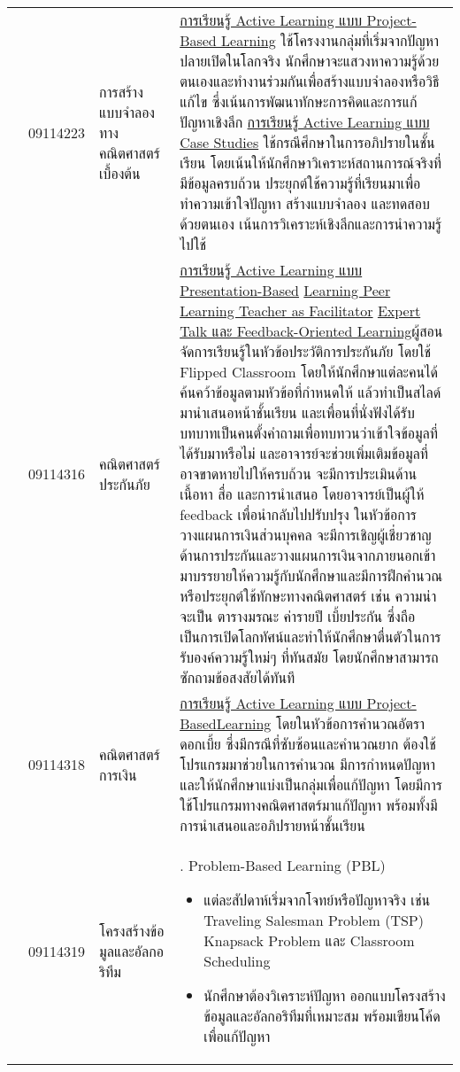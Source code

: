 {\begin{center}
\begin{longtable}{|p{}|p{}|p{}|>{\raggedcolumns}p{}|}
	\\ 
	\cline{2-4}
	& 09114223 & การสร้างแบบจำลองทางคณิตศาสตร์เบื้องต้น&
	\underline{การเรียนรู้ Active Learning แบบ Project-Based Learning} ใช้โครงงานกลุ่มที่เริ่มจากปัญหาปลายเปิดในโลกจริง นักศึกษาจะแสวงหาความรู้ด้วยตนเองและทำงานร่วมกันเพื่อสร้างแบบจำลองหรือวิธีแก้ไข ซึ่งเน้นการพัฒนาทักษะการคิดและการแก้ปัญหาเชิงลึก\newline
	\underline{การเรียนรู้ Active Learning แบบ Case Studies} ใช้กรณีศึกษาในการอภิปรายในชั้นเรียน โดยเน้นให้นักศึกษาวิเคราะห์สถานการณ์จริงที่มีข้อมูลครบถ้วน ประยุกต์ใช้ความรู้ที่เรียนมาเพื่อทำความเข้าใจปัญหา สร้างแบบจำลอง และทดสอบด้วยตนเอง เน้นการวิเคราะห์เชิงลึกและการนำความรู้ไปใช้ 
	\\   
	\cline{2-4}
	& 09114316 & คณิตศาสตร์ประกันภัย&
	\underline{การเรียนรู้ Active Learning แบบ Presentation-Based} \underline{Learning Peer Learning Teacher as Facilitator} \underline{Expert Talk และ Feedback-Oriented Learning}\newline ผู้สอนจัดการเรียนรู้ในหัวข้อประวัติการประกันภัย โดยใช้ Flipped Classroom โดยให้นักศึกษาแต่ละคนได้ค้นคว้าข้อมูลตามหัวข้อที่กำหนดให้ แล้วทำเป็นสไลด์มานำเสนอหน้าชั้นเรียน และเพื่อนที่นั่งฟังได้รับบทบาทเป็นคนตั้งคำถามเพื่อทบทวนว่าเข้าใจข้อมูลที่ได้รับมาหรือไม่ และอาจารย์จะช่วยเพิ่มเติมข้อมูลที่อาจขาดหายไปให้ครบถ้วน จะมีการประเมินด้านเนื้อหา สื่อ และการนำเสนอ โดยอาจารย์เป็นผู้ให้ feedback เพื่อนำกลับไปปรับปรุง ในหัวข้อการวางแผนการเงินส่วนบุคคล จะมีการเชิญผู้เชี่ยวชาญด้านการประกันและวางแผนการเงินจากภายนอกเข้ามาบรรยายให้ความรู้กับนักศึกษาและมีการฝึกคำนวณหรือประยุกต์ใช้ทักษะทางคณิตศาสตร์ เช่น ความน่าจะเป็น ตารางมรณะ ค่ารายปี เบี้ยประกัน ซึ่งถือเป็นการเปิดโลกทัศน์และทำให้นักศึกษาตื่นตัวในการรับองค์ความรู้ใหม่ๆ ที่ทันสมัย โดยนักศึกษาสามารถซักถามข้อสงสัยได้ทันที 
		\\
	\cline{2-4}
	& 09114318
	& คณิตศาสตร์การเงิน & \underline{การเรียนรู้ Active Learning แบบ Project-Based}\newline \underline{Learning}
	โดยในหัวข้อการคำนวณอัตราดอกเบี้ย ซึ่งมีกรณีที่ซับซ้อนและคำนวณยาก ต้องใช้โปรแกรมมาช่วยในการคำนวณ มีการกำหนดปัญหาและให้นักศึกษาแบ่งเป็นกลุ่มเพื่อแก้ปัญหา โดยมีการใช้โปรแกรมทางคณิตศาสตร์มาแก้ปัญหา พร้อมทั้งมีการนำเสนอและอภิปรายหน้าชั้นเรียน
	\\ \cline{2-4}
	& 09114319
	& โครงสร้างข้อมูลและอัลกอริทึม & 1. Problem-Based Learning (PBL) 
	\begin{itemize}
		\item แต่ละสัปดาห์เริ่มจากโจทย์หรือปัญหาจริง เช่น
		 Traveling Salesman Problem (TSP) Knapsack Problem และ Classroom Scheduling
		\item นักศึกษาต้องวิเคราะห์ปัญหา ออกแบบโครงสร้างข้อมูลและอัลกอริทึมที่เหมาะสม พร้อมเขียนโค้ดเพื่อแก้ปัญหา

\end{itemize}
\end{longtable}
\end{center}}

